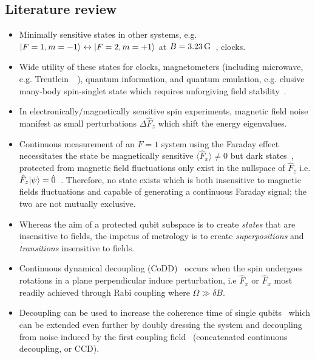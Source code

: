 \documentclass[aps,prl,reprint,superscriptaddress,floatfix]{revtex4-1}
\begin{document}
\subsection{Literature review}
\begin{itemize}
    \item Minimally sensitive states in other systems, e.g. $\vert F=1,m=-1 \rangle  \leftrightarrow \vert F=2,m=+1 \rangle $ at $B=\unit[3.23]{G}$~\cite{matthews_dynamical_1998}, clocks.
    \item[\checkmark] Wide utility of these states for clocks, magnetometers (including microwave, e.g. Treutlein~~\cite{ockeloen_quantum_2013,*horsley_frequency-tunable_2016}), quantum information, and quantum emulation, e.g. elusive many-body spin-singlet state which requires unforgiving field stability~\cite{stamper-kurn_spinor_2013}.
    \item[\checkmark] In electronically/magnetically sensitive spin experiments, magnetic field noise manifest as small perturbations $\Delta \hat{F}_{z}$ which shift the energy eigenvalues.
    \item Continuous measurement of an $F=1$ system using the Faraday effect necessitates the state be magnetically sensitive $\langle \hat{F}_x \rangle \neq 0$ but dark states~, protected from magnetic field fluctuations only exist in the nullspace of $\hat{F}_z$ i.e. $\hat{F}_{z}\vert \psi \rangle  = \hat{0}$~\cite{aharon_general_2013}. 
    Therefore, no state exists which is both insensitive to magnetic fields fluctuations and capable of generating a continuous Faraday signal; the two are not mutually exclusive.
    \item Whereas the aim of a protected qubit subspace is to create \textit{states} that are insensitive to fields, the impetus of metrology is to create \textit{superpositions} and \textit{transitions} insensitive to fields. 
    \item[\checkmark] Continuous dynamical decoupling (CoDD)~\cite{facchi_unification_2004,*fanchini_continuously_2007} occurs when the spin undergoes rotations in a plane perpendicular induce perturbation, i.e $\hat{F}_{x}$ or $\hat{F}_{x}$ most readily achieved through Rabi coupling where $\Omega \gg \delta B$.
    \item[\checkmark] Decoupling can be used to increase the coherence time of single qubits~\cite{golter_protecting_2014} which can be extended even further by doubly dressing the system and decoupling from noise induced by the first coupling field~\cite{cai_robust_2012} (concatenated continuous decoupling, or CCD).

\end{itemize}
\end{document}
